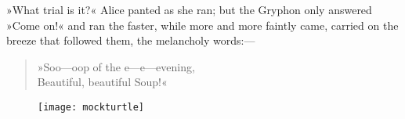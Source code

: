 »What trial is it?« Alice panted as she ran; but the Gryphon only answered »Come on!« and ran the faster, while more and more faintly came, carried on the breeze that followed them, the melancholy words:—

\begin{verse}
»Soo—oop of the e—e—evening,\\
Beautiful, beautiful Soup!«
\end{verse}

\begin{figure}[bh]
\centering
\texttt{[image: mockturtle]}
\end{figure}
